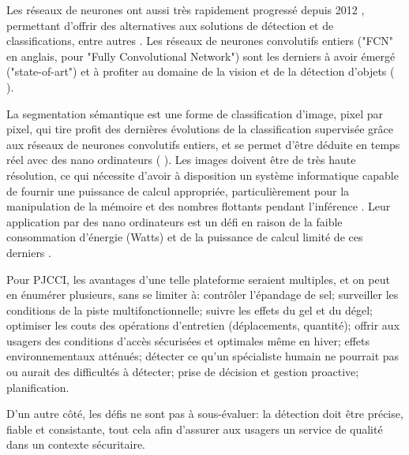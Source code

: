 \par Les réseaux de neurones ont aussi très rapidement progressé depuis 2012 \cite{beam_deep_2017}, permettant d'offrir des alternatives aux solutions de détection et de classifications, entre autres \cite{pathak_architecturally_2019}. Les réseaux de neurones convolutifs entiers ("FCN" en anglais, pour "Fully Convolutional Network") sont les derniers à avoir émergé ("state-of-art") \cite{jia_real-time_2020} et à profiter au domaine de la vision et de la détection d'objets (\cite{nguyen_mavnet_2019} \cite{jia_real-time_2020}).
\par La segmentation sémantique est une forme de classification d'image, pixel par pixel, qui tire profit des dernières évolutions de la classification supervisée grâce aux réseaux de neurones convolutifs entiers, et se permet d'être déduite en temps réel avec des nano ordinateurs (\cite{long_fully_2015} \cite{blanco-filgueira_deep_2019}). Les images doivent être de très haute résolution, ce qui nécessite d'avoir à disposition un système informatique capable de fournir une puissance de calcul appropriée, particulièrement pour la manipulation de la mémoire et des nombres flottants pendant l'inférence \cite{mody_low_2018}. Leur application par des nano ordinateurs est un défi en raison de la faible consommation d'énergie (Watts) et de la puissance de calcul limité de ces derniers \cite{copel_whats_2016}.
\par Pour PJCCI, les avantages d'une telle plateforme seraient multiples, et on peut en énumérer plusieurs, sans se limiter à: contrôler l'épandage de sel; surveiller les conditions de la piste multifonctionnelle; suivre les effets du gel et du dégel; optimiser les couts des opérations d'entretien (déplacements, quantité); offrir aux usagers des conditions d'accès sécurisées et optimales même en hiver; effets environnementaux atténués; détecter ce qu'un spécialiste humain ne pourrait pas ou aurait des difficultés à détecter; prise de décision et gestion proactive; planification.
\par D'un autre côté, les défis ne sont pas à sous-évaluer: la détection doit être précise, fiable et consistante, tout cela afin d'assurer aux usagers un service de qualité dans un contexte sécuritaire.
